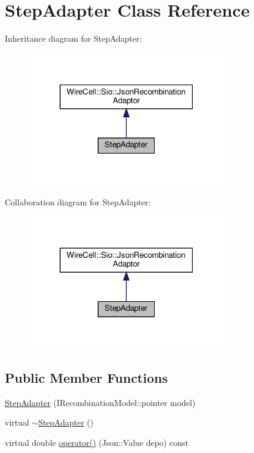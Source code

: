 \hypertarget{class_step_adapter}{}\section{Step\+Adapter Class Reference}
\label{class_step_adapter}


Inheritance diagram for Step\+Adapter\+:
\nopagebreak
\begin{figure}[H]
\begin{center}
\leavevmode
\includegraphics[width=247pt]{class_step_adapter__inherit__graph}
\end{center}
\end{figure}


Collaboration diagram for Step\+Adapter\+:
\nopagebreak
\begin{figure}[H]
\begin{center}
\leavevmode
\includegraphics[width=247pt]{class_step_adapter__coll__graph}
\end{center}
\end{figure}
\subsection*{Public Member Functions}
\begin{DoxyCompactItemize}
\item 
\hyperlink{class_step_adapter_af619584838f11883d0971e76a4932749}{Step\+Adapter} (I\+Recombination\+Model\+::pointer model)
\item 
virtual \hyperlink{class_step_adapter_ab41049e108a34c1992619612db92ac02}{$\sim$\+Step\+Adapter} ()
\item 
virtual double \hyperlink{class_step_adapter_a62cc5e77f7284972207ce48476ee4e9a}{operator()} (Json\+::\+Value depo) const
\end{DoxyCompactItemize}


